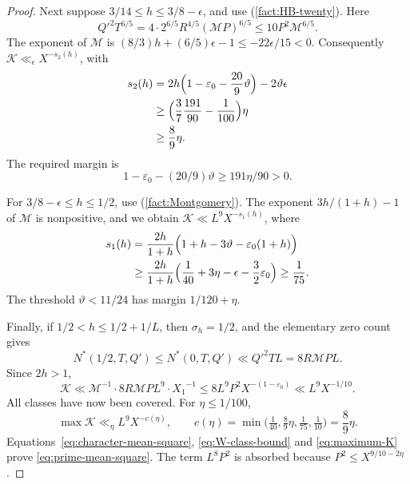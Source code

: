\documentclass{amsart}
\newcounter{fact}
\numberwithin{equation}{section}
\numberwithin{table}{section}
\begin{document}
\begin{proof}
Next suppose $3/14\le h\le3/8-\epsilon$, and use (\ref{fact:HB-twenty}).
Here
\[
Q'^2T^{6/5}=4\cdot2^{6/5}R^{4/5}(\mathcal MP)^{6/5}
\le10P^2\mathcal M^{6/5}.
\]
The exponent of $\mathcal M$ is
$(8/3)h+(6/5)\epsilon-1\le-22\epsilon/15<0$.
Consequently $\mathcal K\ll_\epsilon X^{-s_2(h)}$, with
\begin{equation}\label{eq:density-s2}
\begin{split}
s_2(h)&=2h\Bigl(1-\varepsilon_0-\frac{20}9\vartheta\Bigr)
-2\vartheta\epsilon\\
&\ge\Bigl(\frac37\frac{191}{90}-\frac1{100}\Bigr)\eta\\
&\ge\frac89\eta.
\end{split}
\end{equation}
The required margin is
\begin{equation}\label{eq:critical-density-margin}
1-\varepsilon_0-(20/9)\vartheta\ge191\eta/90>0.
\end{equation}

For $3/8-\epsilon\le h\le1/2$, use (\ref{fact:Montgomery}). The
exponent $3h/(1+h)-1$ of $\mathcal M$ is nonpositive, and we obtain $\mathcal K\ll L^9X^{-s_1(h)}$, where
\begin{equation}\label{eq:density-s1}
\begin{split}
s_1(h)&=\frac{2h}{1+h}
\Bigl(1+h-3\vartheta-\varepsilon_0(1+h)\Bigr)\\
&\ge\frac{2h}{1+h}
\Bigl(\frac1{40}+3\eta-\epsilon-\frac32\varepsilon_0\Bigr)
\ge\frac1{75}.
\end{split}
\end{equation}
The threshold $\vartheta<11/24$ has margin $1/120+\eta$.

Finally, if $1/2<h\le1/2+1/L$, then $\sigma_h=1/2$, and the elementary
zero count gives
\[
N^*(1/2,T,Q')\le N^*(0,T,Q')\ll Q'^2TL=8R\mathcal MP L.
\]
Since $2h>1$,
\[
\mathcal K\ll\mathcal M^{-1}\cdot8R\mathcal MP L^9\cdot {X_1}^{-1}
\le8L^9P^2X^{-(1-\varepsilon_0)}\ll L^9X^{-1/10}.
\]
All classes have now been covered. For $\eta\le1/100$,
\begin{equation}\label{eq:maximum-K}
\max\mathcal K\ll_\eta L^9X^{-c(\eta)},\qquad
c(\eta)=\min\bigl(\tfrac1{40},\tfrac89\eta,\tfrac1{75},\tfrac1{10}\bigr)
=\frac89\eta.
\end{equation}
Equations~\eqref{eq:character-mean-square}, \eqref{eq:W-class-bound}
and \eqref{eq:maximum-K} prove \eqref{eq:prime-mean-square}.
The term $L^8P^2$ is absorbed because $P^2\le X^{9/10-2\eta}$.
\end{proof}
\end{document}
